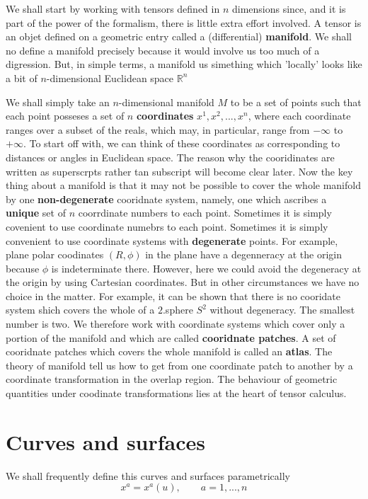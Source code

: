 We shall start by working with tensors defined in $n$ dimensions since, and it is part of the power of the formalism, there is little extra effort involved. A tensor is an objet defined on a geometric entry called a (differential) \textbf{manifold}. We shall no define a manifold precisely because it would involve us too much of a digression. But, in simple terms, a manifold us simething which 'locally' looks like a bit of $n$-dimensional Euclidean space $\mathbb{R}^{n}$

We shall simply take an $n$-dimensional manifold $M$ to be a set of points such that each point posseses a set of $n$ \textbf{coordinates} $x^{1},x^{2},...,x^{n}$, where each coordinate ranges over a subset of the reals, which may, in particular, range from $-\infty$ to $+\infty$. To start off with, we can think of these coordinates as corresponding to distances or angles in Euclidean space. The reason why the cooridinates are written as superscrpts rather tan subscript will become clear later. Now the key thing about a manifold is that it may not be possible to cover the whole manifold by one \textbf{non-degenerate} cooridnate system, namely, one which ascribes a \textbf{unique} set of $n$ coorrdinate numbers to each point. Sometimes it is simply covenient to use coordinate numebrs to each point. Sometimes it is simply convenient to use coordinate systems with \textbf{degenerate} points. For example, plane polar coodinates $(R,\phi)$ in the plane have a degenneracy at the origin because $\phi$ is indeterminate there. However, here we could avoid the degeneracy at the origin by using Cartesian coordinates. But in other circumstances we have no choice in the matter. For example, it can be shown that there is no cooridate system shich covers the whole of a $2$.sphere $S^2$ without degeneracy. The smallest number is two. We therefore work with coordinate systems which cover only a portion of the manifold and which are called \textbf{cooridnate patches}. A set of cooridnate patches which covers the whole manifold is called an \textbf{atlas}. The theory of manifold tell us how to get from one coordinate patch to another by a coordinate transformation in the overlap region. The behaviour of geometric quantities under coodinate transformations lies at the heart of tensor calculus.

\section{Curves and surfaces}
We shall frequently define this curves and surfaces parametrically
\begin{equation}\label{5.1}
  x^{a} = x^{a}(u), \qquad a=1,...,n 
\end{equation}

